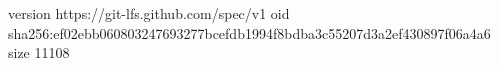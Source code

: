version https://git-lfs.github.com/spec/v1
oid sha256:ef02ebb060803247693277bcefdb1994f8bdba3c55207d3a2ef430897f06a4a6
size 11108
